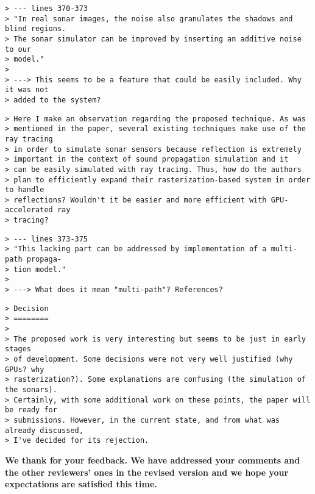 \documentclass{article}
\begin{document}

\begin{verbatim}
> --- lines 370-373
> "In real sonar images, the noise also granulates the shadows and blind regions.
> The sonar simulator can be improved by inserting an additive noise to our
> model."
>
> ---> This seems to be a feature that could be easily included. Why it was not
> added to the system?

\end{verbatim}


\begin{verbatim}
> Here I make an observation regarding the proposed technique. As was
> mentioned in the paper, several existing techniques make use of the ray tracing
> in order to simulate sonar sensors because reflection is extremely
> important in the context of sound propagation simulation and it
> can be easily simulated with ray tracing. Thus, how do the authors
> plan to efficiently expand their rasterization-based system in order to handle
> reflections? Wouldn't it be easier and more efficient with GPU-accelerated ray
> tracing?
\end{verbatim}


\begin{verbatim}
> --- lines 373-375
> "This lacking part can be addressed by implementation of a multi-path propaga-
> tion model."
>
> ---> What does it mean "multi-path"? References?
\end{verbatim}


\begin{verbatim}
> Decision
> ========
>
> The proposed work is very interesting but seems to be just in early stages
> of development. Some decisions were not very well justified (why GPUs? why
> rasterization?). Some explanations are confusing (the simulation of the sonars).
> Certainly, with some additional work on these points, the paper will be ready for
> submissions. However, in the current state, and from what was already discussed,
> I've decided for its rejection.
\end{verbatim}

\textbf{We thank for your feedback. We have addressed your comments and the other
reviewers' ones in the revised version and we hope your expectations are
satisfied this time.}
\end{document}
